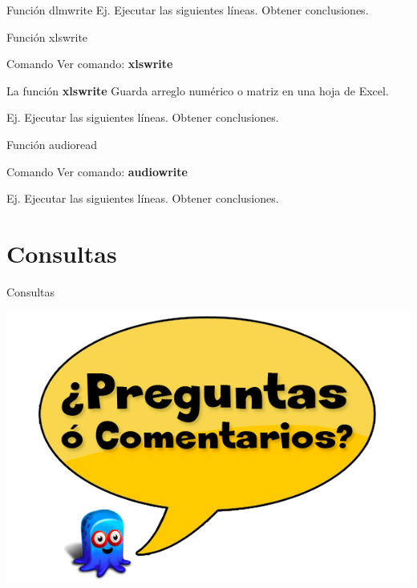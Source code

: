 \documentclass{bredelebeamer}
\begin{document}
\begin{frame}{Función dlmwrite}
Ej. Ejecutar las siguientes líneas. Obtener conclusiones.
\begin{center}

\end{center}
\end{frame}

\begin{frame}{Función xlswrite}
\begin{exampleblock}{Comando}
Ver comando: \textbf{xlswrite}
\end{exampleblock}
La función \textbf{xlswrite} Guarda arreglo numérico o matriz en una hoja de Excel.

Ej. Ejecutar las siguientes líneas. Obtener conclusiones.
\begin{center}

\end{center}
\end{frame}
\begin{frame}{Función audioread}

\begin{exampleblock}{Comando}
Ver comando: \textbf{audiowrite}
\end{exampleblock}

Ej. Ejecutar las siguientes líneas. Obtener conclusiones.
\begin{center}

\end{center}

\end{frame}




\section{Consultas}
\begin{frame}{Consultas}
\begin{center}
\includegraphics[scale=0.3]{images/consultas.png}
\end{center}
\end{frame}
\end{document}
